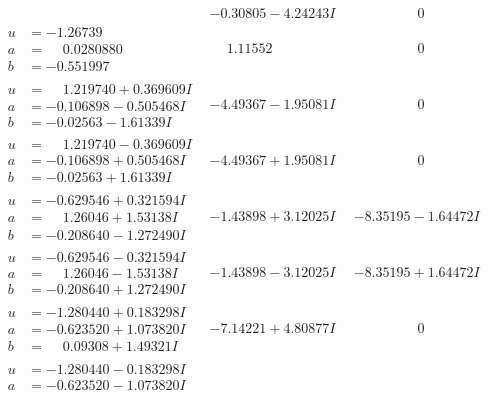 \documentclass[1p]{elsarticle_modified}
\theoremstyle{definition}
\begin{document}
$$\begin{array}{c|c|c}
 & -0.30805 - 4.24243 I & \phantom{-0.000000 } 0 \\ \hline\begin{aligned}
u &= -1.26739\phantom{ +0.000000I} \\
a &= \phantom{-}0.0280880\phantom{ +0.000000I} \\
b &= -0.551997\phantom{ +0.000000I}\end{aligned}
 & \phantom{-}1.11552\phantom{ +0.000000I} & \phantom{-0.000000 } 0 \\ \hline\begin{aligned}
u &= \phantom{-}1.219740 + 0.369609 I \\
a &= -0.106898 - 0.505468 I \\
b &= -0.02563 - 1.61339 I\end{aligned}
 & -4.49367 - 1.95081 I & \phantom{-0.000000 } 0 \\ \hline\begin{aligned}
u &= \phantom{-}1.219740 - 0.369609 I \\
a &= -0.106898 + 0.505468 I \\
b &= -0.02563 + 1.61339 I\end{aligned}
 & -4.49367 + 1.95081 I & \phantom{-0.000000 } 0 \\ \hline\begin{aligned}
u &= -0.629546 + 0.321594 I \\
a &= \phantom{-}1.26046 + 1.53138 I \\
b &= -0.208640 - 1.272490 I\end{aligned}
 & -1.43898 + 3.12025 I & -8.35195 - 1.64472 I \\ \hline\begin{aligned}
u &= -0.629546 - 0.321594 I \\
a &= \phantom{-}1.26046 - 1.53138 I \\
b &= -0.208640 + 1.272490 I\end{aligned}
 & -1.43898 - 3.12025 I & -8.35195 + 1.64472 I \\ \hline\begin{aligned}
u &= -1.280440 + 0.183298 I \\
a &= -0.623520 + 1.073820 I \\
b &= \phantom{-}0.09308 + 1.49321 I\end{aligned}
 & -7.14221 + 4.80877 I & \phantom{-0.000000 } 0 \\ \hline\begin{aligned}
u &= -1.280440 - 0.183298 I \\
a &= -0.623520 - 1.073820 I \\

\end{aligned}
\end{array}$$
\end{document}
